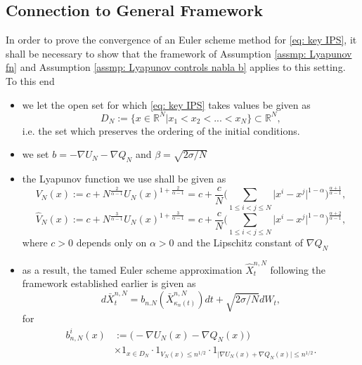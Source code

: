 \documentclass{article}
\begin{document}
\subsection{Connection to General Framework}\label{subsec: connection general framework}
    In order to prove the convergence of an Euler scheme method for \eqref{eq: key IPS}, it shall be necessary to show that the framework of Assumption \ref{assmp: Lyapunov fn} and Assumption \ref{assmp: Lyapunov controls nabla b} applies to this setting. To this end
    \begin{itemize}
        \item we let the open set for which \eqref{eq: key IPS} takes values be given as
        \begin{equation}\label{eq: D_N defn}
    D_N:=\{x\in \mathbb{R}^N\vert x_1< x_2<...<x_N\}\subset \mathbb{R}^N,
\end{equation}
i.e. the set which preserves the ordering of the initial conditions.
\item we set $b=-\nabla U_N-\nabla Q_N$ and $\beta=\sqrt{2\sigma/N}$
\item the Lyapunov function we use shall be given as 
\begin{equation}\label{eq: V_N defn}
        V_N(x):=c+N^{\frac{2}{\alpha-1}}U_N(x)^{1+\frac{2}{\alpha-1}}= c+\frac{c}{N}\biggr (\sum_{1\leq i<j\leq N} \lvert x^i-x^j\rvert^{1-\alpha} \biggr)^{\frac{\alpha+1}{\alpha-1}},
    \end{equation}
     \begin{equation}\label{eq: V_N hat defn}
        \hat{V}_N(x):=c+N^{\frac{3}{\alpha-1}}U_N(x)^{1+\frac{3}{\alpha-1}}= c+\frac{c}{N}\biggr (\sum_{1\leq i<j\leq N} \lvert x^i-x^j\rvert^{1-\alpha} \biggr)^{\frac{\alpha+2}{\alpha-1}},
    \end{equation}
    where $c>0$ depends only on $\alpha>0$ and the Lipschitz constant of $\nabla Q_N$
    \item as a result, the tamed Euler scheme approximation $\hat{X}^{n,N}_t$ following the framework established earlier is given as
    \begin{equation}\label{eq: IPS Euler scheme}
      d\bar{X}^{n,N}_t =b_{n.N}(\bar{X}^{n,N}_{\kappa_n(t)})dt+\sqrt{2\sigma/N}dW_t,
    \end{equation}
    for 
    \begin{align}\label{eq: tamed IPS coeff}
        b_{n,N}^i(x)&:=\biggr (-\nabla U_N(x)-\nabla Q_N(x)\biggr)\nonumber \\
        &\times1_{x\in D_N}\cdot1_{V_N(x)\leq n^{1/2}}\cdot 1_{\lvert \nabla U_N(x)+\nabla Q_N(x)\rvert\leq n^{1/2}}.
    \end{align}
    \end{itemize}
\end{document}

